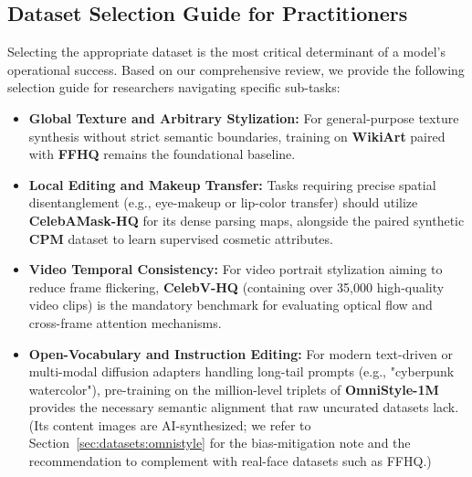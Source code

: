 \documentclass[journal]{IEEEtran}
\begin{document}
\subsection{Dataset Selection Guide for Practitioners}
\label{sec:datasets:guide}

Selecting the appropriate dataset is the most critical determinant of a model's operational success. Based on our comprehensive review, we provide the following selection guide for researchers navigating specific sub-tasks:

\begin{itemize}
\item \textbf{Global Texture and Arbitrary Stylization:} For general-purpose texture synthesis without strict semantic boundaries, training on \textbf{WikiArt} paired with \textbf{FFHQ} remains the foundational baseline.
\item \textbf{Local Editing and Makeup Transfer:} Tasks requiring precise spatial disentanglement (e.g., eye-makeup or lip-color transfer) should utilize \textbf{CelebAMask-HQ} for its dense parsing maps, alongside the paired synthetic \textbf{CPM} dataset \cite{nguyen2021lipstick} to learn supervised cosmetic attributes.
\item \textbf{Video Temporal Consistency:} For video portrait stylization aiming to reduce frame flickering, \textbf{CelebV-HQ} \cite{celebvhq} (containing over 35,000 high-quality video clips) is the mandatory benchmark for evaluating optical flow and cross-frame attention mechanisms.
\item \textbf{Open-Vocabulary and Instruction Editing:} For modern text-driven or multi-modal diffusion adapters handling long-tail prompts (e.g., "cyberpunk watercolor"), pre-training on the million-level triplets of \textbf{OmniStyle-1M} \cite{wang2025omnistyle} provides the necessary semantic alignment that raw uncurated datasets lack. (Its content images are AI-synthesized; we refer to Section~\ref{sec:datasets:omnistyle} for the bias-mitigation note and the recommendation to complement with real-face datasets such as FFHQ.)
\end{itemize}
\end{document}
